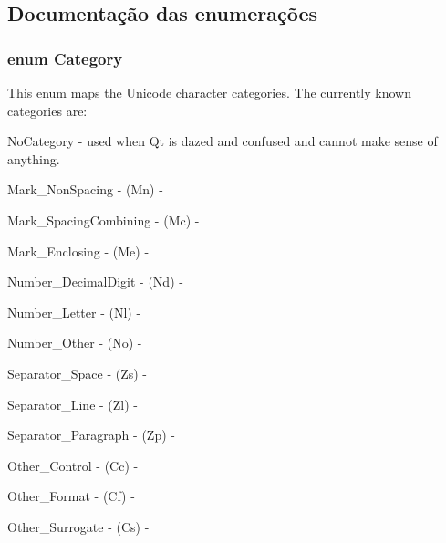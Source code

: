 \subsection{Documentação das enumerações}
\hypertarget{class_q_char_a9ca8f05608edcbf85ab6c2c85a439ccb}{
\subsubsection[{Category}]{\setlength{\rightskip}{0pt plus 5cm}enum {\bf Category}}}\label{class_q_char_a9ca8f05608edcbf85ab6c2c85a439ccb}
This enum maps the Unicode character categories. The currently known categories are\-: 
\begin{DoxyItemize}
\item {\ttfamily No\-Category} -\/ used when Qt is dazed and confused and cannot make sense of anything.


\item {\ttfamily Mark\-\_\-\-Non\-Spacing} -\/ (Mn) -\/


\item {\ttfamily Mark\-\_\-\-Spacing\-Combining} -\/ (Mc) -\/


\item {\ttfamily Mark\-\_\-\-Enclosing} -\/ (Me) -\/


\item {\ttfamily Number\-\_\-\-Decimal\-Digit} -\/ (Nd) -\/


\item {\ttfamily Number\-\_\-\-Letter} -\/ (Nl) -\/


\item {\ttfamily Number\-\_\-\-Other} -\/ (No) -\/


\item {\ttfamily Separator\-\_\-\-Space} -\/ (Zs) -\/


\item {\ttfamily Separator\-\_\-\-Line} -\/ (Zl) -\/


\item {\ttfamily Separator\-\_\-\-Paragraph} -\/ (Zp) -\/


\item {\ttfamily Other\-\_\-\-Control} -\/ (Cc) -\/


\item {\ttfamily Other\-\_\-\-Format} -\/ (Cf) -\/


\item {\ttfamily Other\-\_\-\-Surrogate} -\/ (Cs) -\/



\end{DoxyItemize}
